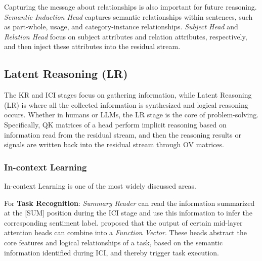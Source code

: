 \documentclass[12pt,letterpaper]{article}
\begin{document}
Capturing the message about relationships is also important for future reasoning. \textit{Semantic Induction Head} captures semantic relationships within sentences, such as part-whole, usage, and category-instance relationships.\citep{Semantic_24_arXiv_SJTU}
\textit{Subject Head} and \textit{Relation Head} focus on subject attributes and relation attributes, respectively, and then inject these attributes into the residual stream.\citep{FactualRecall_24_arXiv_Independent}

\subsection*{Latent Reasoning (LR)} \label{subsec:LR}
The KR and ICI stages focus on gathering information, while Latent Reasoning (LR) is where all the collected information is synthesized and logical reasoning occurs. Whether in humans or LLMs, the LR stage is the core of problem-solving. Specifically, QK matrices of a head perform implicit reasoning based on information read from the residual stream, and then the reasoning results or signals are written back into the residual stream through OV matrices.

\subsubsection*{In-context Learning} \label{subsubsec:in-context}
In-context Learning is one of the most widely discussed areas. 


For \textbf{Task Recognition}: \textit{Summary Reader} can read the information summarized at the [SUM] position during the ICI stage and use this information to infer the corresponding sentiment label.\citep{Sentiment_23_arXiv_EleutherAI}
\citet{FunctionVector_24_ICLR_NEU} proposed that the output of certain mid-layer attention heads can combine into a \textit{Function Vector}. These heads abstract the core features and logical relationships of a task, based on the semantic information identified during ICI, and thereby trigger task execution.
\end{document}
